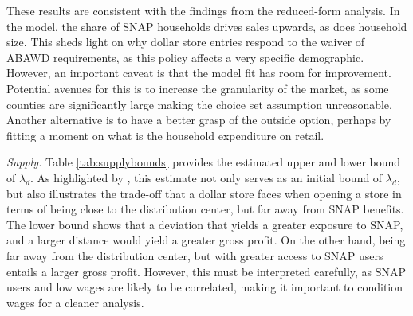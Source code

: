 \documentclass[11.5pt]{article}
\begin{document}
These results are consistent with the findings from the reduced-form analysis. In the model, the share of SNAP households drives sales upwards, as does household size. This sheds light on why dollar store entries respond to the waiver of ABAWD requirements, as this policy affects a very specific demographic. However, an important caveat is that the model fit has room for improvement. Potential avenues for this is to increase the granularity of the market, as some counties are significantly large making the choice set assumption unreasonable. Another alternative is to have a better grasp of the outside option, perhaps by fitting a moment on what is the household expenditure on retail. 






\newpage
\textit{Supply.} Table \ref{tab:supplybounds} provides the estimated upper and lower bound of $\lambda_d$. As highlighted by \citeauthor{houde2023nexus} \citeyear{houde2023nexus}, this estimate not only serves as an initial bound of $\lambda_d$, but also illustrates the trade-off that a dollar store faces when opening a store in terms of being close to the distribution center, but far away from SNAP benefits. The lower bound shows that a deviation that yields a greater exposure to SNAP, and a larger distance would yield a greater gross profit. On the other hand, being far away from the distribution center, but with greater access to SNAP users entails a larger gross profit. However, this must be interpreted carefully, as SNAP users and low wages are likely to be correlated, making it important to condition wages for a cleaner analysis. 




\end{document}
